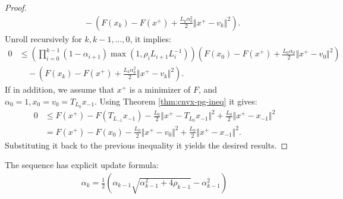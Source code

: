 \documentclass[12pt]{report}
\begin{document}
\begin{proof}
{\begin{align*}
                    & \quad 
                    - \left(
                        F(x_k) - F(x^+) + \frac{L_k\alpha_k^2}{2}\Vert x^+ - v_k\Vert^2
                    \right). 
            \end{align*}
            }
            Unroll recursively for $k, k-1, \ldots, 0$, it implies: 
            \begin{align*}
                0
                &\le 
                \left(
                    \prod^{k - 1}_{i = 0} (1 - \alpha_{i + 1})\max(1, \rho_{i}L_{i + 1}L^{-1}_i)
                \right)\left(
                    F(x_0) - F(x^+) + \frac{L_0 \alpha_0}{2}\Vert x^+ - v_0\Vert^2
                \right) \\
                    & \quad 
                    - \left(
                        F(x_k) - F(x^+) + \frac{L_k\alpha_k^2}{2}\Vert x^+ - v_k\Vert^2
                    \right). 
            \end{align*}
            If in addition, we assume that $x^+$ is a minimizer of $F$, and $\alpha_0 = 1, x_0 = v_0 = T_{L_0}x_{-1}$. 
            Using Theorem \ref{thm:cnvx-pg-ineq} it gives: 
            \begin{align*}
                0 &\le 
                F(x^+) - F(T_{L_{-1}}x_{-1}) - \frac{L_0}{2}\Vert x^+ - T_{L_0}x_{-1}\Vert^2 + 
                \frac{L_0}{2}\Vert x^+ - x_{-1}\Vert^2
                \\
                &= 
                F(x^+) - F(x_0) - \frac{L_0}{2}\Vert x^+ - v_0\Vert^2 + 
                \frac{L_0}{2}\Vert x^+ - x_{-1}\Vert^2. 
            \end{align*}
            Substituting it back to the previous inequality it yields the desired results. 
        \end{proof}
        \begin{remark}
            The sequence has explicit update formula: 
            \begin{align*}
                \alpha_k = 
                \frac{1}{2}
                \left(
                    \alpha_{k - 1}\sqrt{\alpha_{k -1}^2 + 4 \rho_{k - 1}} - \alpha^2_{k - 1}
                \right)
            \end{align*}
        \end{remark}
\end{document}
